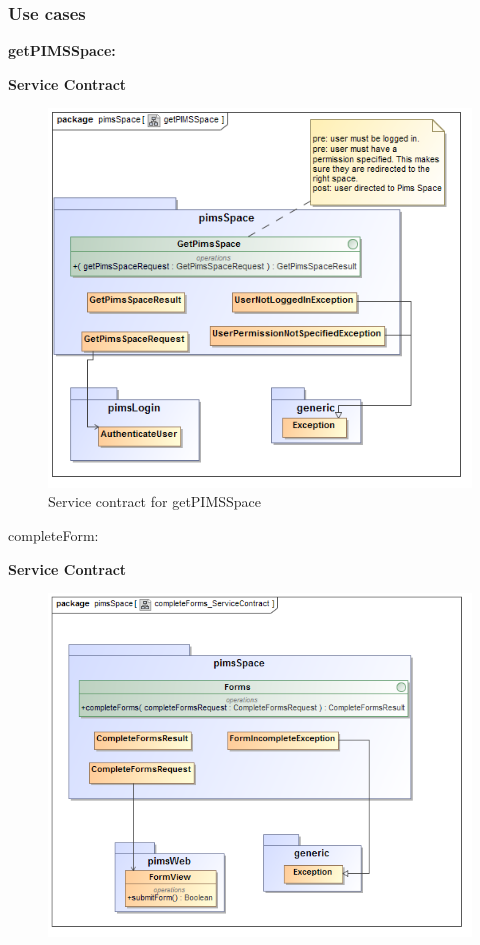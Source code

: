 \subsubsection{Use cases}
\begin{description}
	\item{\textbf{getPIMSSpace:}}
		\begin{description}
		\item{\textbf{Service Contract}}
		\begin{figure}[H]
			\centerline{\includegraphics[width=0.7\linewidth]{./Graphics/pimsSpace/getPIMSSpace}}
			\caption{Service contract for getPIMSSpace}
		\end{figure}
	\end{description} 
	\item{completeForm:}
			\begin{description}
		\item{\textbf{Service Contract}}
		\begin{figure}[H]
			\centerline{\includegraphics[width=0.7\linewidth]{./Graphics/pimsSpace/completeForms_ServiceContract}}

\end{figure}
\end{description}
\end{description}
